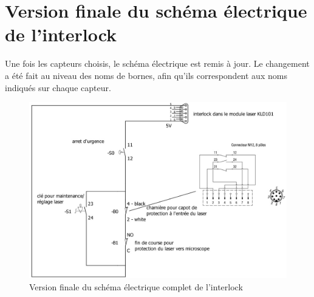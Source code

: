 \section{Version finale du schéma électrique de l'interlock}
Une fois les capteurs choisis, le schéma électrique est remis à jour. Le changement a été fait au niveau des noms de bornes, afin qu'ils correspondent aux noms indiqués sur chaque capteur.

\begin{figure}[H]
    \begin{center}
        \includegraphics[width=\textwidth]{assets/figures/Protections_laser/Securite_electrique/interlock_schema_elec_V2.jpg}
    \end{center}
    \caption{Version finale du schéma électrique complet de l'interlock}
    \label{schema_interlock_v2}
\end{figure}

